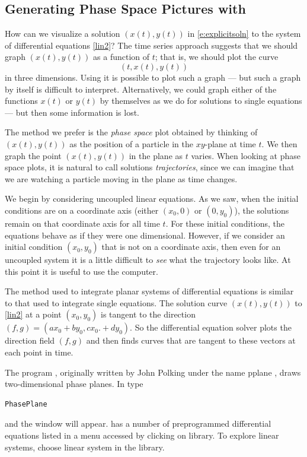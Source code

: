 \documentclass{ximera}
\begin{document}
\subsection*{Generating Phase Space Pictures with {\pplane}}

How can we visualize a solution $(x(t),y(t))$ in \eqref{e:explicitsoln} 
to the system of differential equations \eqref{lin2}?  The time series approach
suggests that we should graph $(x(t),y(t))$ as a function of $t$;
that is, we should plot the curve
\[
(t,x(t),y(t))
\]
in three dimensions.  Using \Matlab it is
possible to plot such a graph --- but such a graph by itself is
difficult to interpret.  Alternatively, we could graph either of
the functions $x(t)$ or $y(t)$ by themselves as we do for
solutions to single equations --- but then some information is
lost.

The method we prefer is the {\em phase space\/} 
plot obtained by thinking of $(x(t),y(t))$ as the
position of a particle in the $xy$-plane at time $t$.  We then
graph the point $(x(t),y(t))$ in the plane as $t$ varies.  When
looking at phase space plots, it is natural to call solutions
{\em trajectories\/}, since we can imagine
that we are watching a particle moving in the plane as time
changes.

We begin by considering uncoupled linear equations.  As we saw,
when the initial conditions are on a coordinate axis (either
$(x_0,0)$ or $(0,y_0)$), the solutions remain on that coordinate
axis for all time $t$.  For these initial conditions, the equations behave as if
they were one dimensional.  However, if we consider an initial
condition $(x_0,y_0)$ that is not on a coordinate axis, then even
for an uncoupled system it is a little difficult to
{\em see\/} what the trajectory looks like.  At this point
it is useful to use the computer.

The method used to integrate planar systems of 
differential equations is similar to that used to integrate
single equations.  The solution
curve $(x(t),y(t))$ to \eqref{lin2} at a point $(x_0,y_0)$ is
tangent to the direction $(f,g) = (ax_0 + by_0, cx_0. + dy_0)$.  So
the differential equation solver plots the direction field
$(f,g)$ and then finds curves that are tangent to these
vectors at each point in time.

The program {\pplane}, originally written by John
Polking under the name {\sf pplane} , draws two-dimensional phase planes.  
In \Matlab type
\begin{verbatim}
PhasePlane
\end{verbatim}
and the \pplane\; window will appear. {\pplane}
has a number of preprogrammed differential equations listed in a
menu accessed by clicking on {\sf library}.  To explore linear
systems, choose {\sf linear system} in the {\sf library}.  
\end{document}
